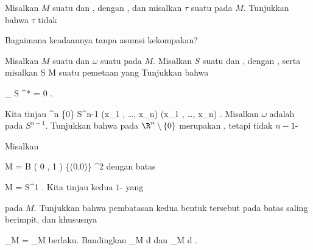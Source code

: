 {}
{

Misalkan $M$ suatu
 dan
 {} {},
dengan
,
dan misalkan $\tau$ suatu
pada $M$. Tunjukkan bahwa $\tau$ tidak

}
{Bagaimana keadaannya tanpa asumsi kekompakan?} {}

{}
{

Misalkan $M$ suatu
dan $\omega$ suatu
 
pada $M$. Misalkan $S$ suatu
 dan
 {} {},
dengan
,
serta misalkan
\maabbdisp {\varphi} { S } { M
} {}
suatu pemetaan yang
Tunjukkan bahwa

\mavergleichskettedisp
{\vergleichskette
{
\int_{  S  }   \varphi^*\omega
}
{ =} { 0
}
{ } {
}
{ } {
}
{ } {
}
}
{}{}{.}

}
{} {}

{}
{

Kita tinjau
 {} {}
\maabbeledisp {\pi} {\R^n \setminus \{0\}} { S^{n-1}
} {(x_1 , \ldots , x_n) } { {  } (x_1 , \ldots , x_n)
} {.}
Misalkan $\omega$ adalah
pada $S^{n-1}$. Tunjukkan bahwa
\mathl{\pi^* \omega}{} pada $\R^n \setminus \{0\}$ merupakan
,
tetapi tidak
$n-1$-

}
{} {}

{}
{

Misalkan

\mavergleichskette
{\vergleichskette
{ M
}
{ = }{ B  \left(  0 , 1 \right) \setminus \{(0,0)\}
}
{ \subset }{ \R^2
}
{    }{
}
{   }{
}
}
{}{}{}
dengan batas

\mavergleichskette
{\vergleichskette
{ \partial M
}
{ = }{ S^1
}
{  }{
}
{    }{
}
{   }{
}
}
{}{}{.}
Kita tinjau kedua
$1$-
yang

 {  }

pada $M$. Tunjukkan bahwa pembatasan kedua bentuk tersebut pada batas saling berimpit, dan khususnya

\mavergleichskette
{\vergleichskette
{ \int_{\partial M} \omega
}
{ =} { \int_{\partial M} \tau
}
{  }{
}
{    }{
}
{   }{
}
}
{}{}{}
berlaku. Bandingkan
\mathkor {} {\int_M d \omega} {dan} {\int_M d \tau} {.}

}
{} {}

